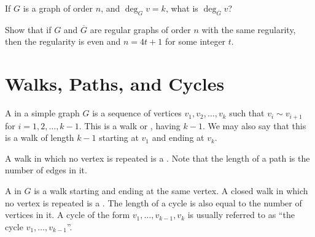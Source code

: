 \begin{Exercise}
If $G$ is a graph of order $n$, and $\deg_G v = k$, what is $\deg_{\overline G} v$?
\end{Exercise}

\begin{Exercise}
Show that if $G$ and $\overline G$ are regular graphs of order $n$ with the same regularity, then the regularity is even and $n = 4t + 1$ for some integer $t$.
\end{Exercise}

\section{Walks, Paths, and Cycles}\label{sec:Walks}

A  in a simple graph $G$ is a sequence of vertices $v_1, v_2, \ldots, v_k$ such that $v_i \sim v_{i + 1}$ for $i = 1, 2, \ldots, k - 1$. This is a walk  or , having  $k - 1$. We may also say that this is a walk of length $k - 1$ starting at $v_1$ and ending at $v_k$.

A walk in which no vertex is repeated is a . Note that the length of a path is the number of edges in it.

A  in $G$ is a walk starting and ending at the same vertex. A closed walk in which no vertex is repeated is a . The length of a cycle is also equal to the number of vertices in it. A cycle of the form $v_1, \ldots, v_{k-1}, v_k$ is usually referred to as ``the cycle $v_1, \ldots, v_{k-1}$''.

